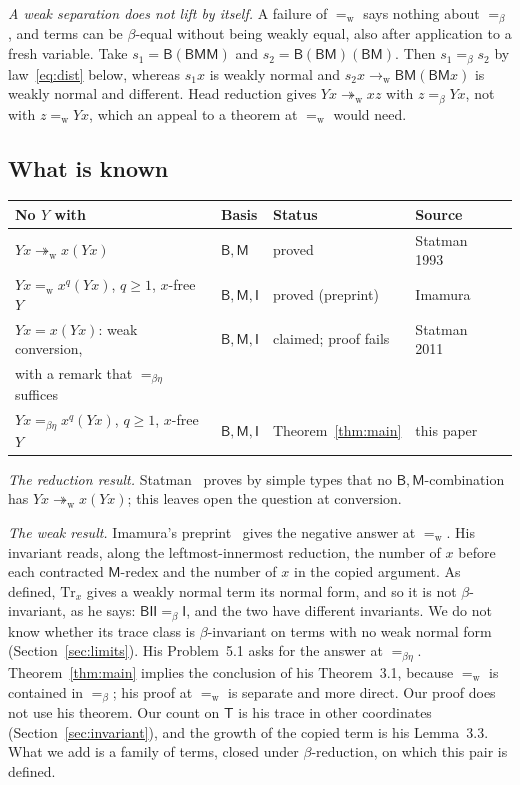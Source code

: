 \documentclass[a4paper,english]{lipics-v2021}
\newcommand{\B}{\mathsf{B}}
\newcommand{\M}{\mathsf{M}}
\newcommand{\I}{\mathsf{I}}
\newcommand{\T}{\mathsf{T}}
\newcommand{\wred}{\to_{\mathrm{w}}}
\newcommand{\wreds}{\twoheadrightarrow_{\mathrm{w}}}
\newcommand{\eqw}{=_{\mathrm{w}}}
\newcommand{\eqb}{=_{\beta}}
\newcommand{\eqbe}{=_{\beta\eta}}
\begin{document}
\emph{A weak separation does not lift by itself.} A failure of $\eqw$ says nothing about $\eqb$, and terms can be $\beta$-equal without being weakly equal, also after application to a fresh variable. Take $s_1 = \B(\B\M\M)$ and $s_2 = \B(\B\M)(\B\M)$. Then $s_1 \eqb s_2$ by law~\eqref{eq:dist} below, whereas $s_1x$ is weakly normal and $s_2x \wred \B\M(\B\M x)$ is weakly normal and different. Head reduction gives $Yx \wreds xz$ with $z \eqb Yx$, not with $z \eqw Yx$, which an appeal to a theorem at $\eqw$ would need.

\subsection{What is known}\label{sec:known}

\begin{center}
\small
\begin{tabular}{@{}llll@{}}
\toprule
No $Y$ with & Basis & Status & Source\\
\midrule
$Yx \wreds x(Yx)$ & $\B,\M$ & proved & Statman 1993~\cite{statman1993}\\
$Yx \eqw x^q(Yx)$, $q\geq 1$, $x$-free $Y$ & $\B,\M,\I$ & proved (preprint) & Imamura~\cite[Thm.~3.1]{imamura1}\\
$Yx = x(Yx)$: weak conversion, & $\B,\M,\I$ & claimed; proof fails & Statman 2011~\cite{statman2011}\\
\qquad with a remark that $\eqbe$ suffices &&&\\
$Yx \eqbe x^q(Yx)$, $q\geq 1$, $x$-free $Y$ & $\B,\M,\I$ & Theorem~\ref{thm:main} & this paper\\
\bottomrule
\end{tabular}
\end{center}

\emph{The reduction result.} Statman~\cite{statman1993} proves by simple types that no $\B,\M$-combination has $Yx \wreds x(Yx)$; this leaves open the question at conversion.

\emph{The weak result.} Imamura's preprint~\cite{imamura1} gives the negative answer at $\eqw$. His invariant reads, along the leftmost-innermost reduction, the number of $x$ before each contracted $\M$-redex and the number of $x$ in the copied argument. As defined, $\mathrm{Tr}_x$ gives a weakly normal term its normal form, and so it is not $\beta$-invariant, as he says: $\B\I\I \eqb \I$, and the two have different invariants. We do not know whether its trace class is $\beta$-invariant on terms with no weak normal form (Section~\ref{sec:limits}). His Problem~5.1 asks for the answer at $\eqbe$. Theorem~\ref{thm:main} implies the conclusion of his Theorem~3.1, because $\eqw$ is contained in $\eqb$; his proof at $\eqw$ is separate and more direct. Our proof does not use his theorem. Our count on $\T$ is his trace in other coordinates (Section~\ref{sec:invariant}), and the growth of the copied term is his Lemma~3.3. What we add is a family of terms, closed under $\beta$-reduction, on which this pair is defined.
\end{document}
